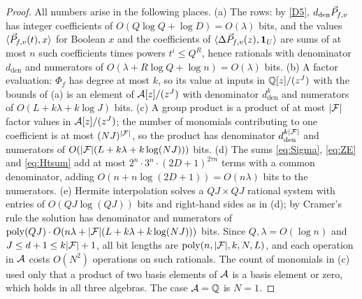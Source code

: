 \begin{proof}
All numbers arise in the following places. (a) The rows: by \ref{D5},
$d_{\mathrm{den}}\vec{P}_{f,v}$ has integer coefficients of $O(Q\log Q+\log D)=O(\lambda)$
bits, and the values $\langle \vec{P}_{f,v}(t),x\rangle$ for Boolean $x$ and the coefficients of
$\langle \Delta\vec{P}_{f,v}(z),\mathbf 1_U\rangle$ are sums of at most $n$ such coefficients
times powers $t^{i}\le Q^{R}$, hence rationals with denominator
$d_{\mathrm{den}}$ and numerators of $O(\lambda+R\log Q+\log n)=O(\lambda)$ bits.
(b) A factor evaluation: $\Phi_f$ has degree at most $k$, so its value at inputs
in $\mathbb{Q}[z]/(z^J)$ with the bounds of (a) is an element of $\mathcal{A}[z]/(z^J)$ with
denominator $d_{\mathrm{den}}^{k}$ and numerators of $O(L+k\lambda+k\log J)$ bits.
(c) A group product is a product of at most $|\mathcal{F}|$ factor values in
$\mathcal{A}[z]/(z^J)$; the number of monomials contributing to one coefficient is at
most $(NJ)^{|\mathcal{F}|}$, so the product has denominator $d_{\mathrm{den}}^{k|\mathcal{F}|}$ and
numerators of $O(|\mathcal{F}|(L+k\lambda+k\log(NJ)))$ bits. (d) The sums
\eqref{eq:Sigma}, \eqref{eq:ZE} and \eqref{eq:Htsum} add at most
$2^{n}\cdot 3^{n}\cdot(2D+1)^{2\tau n}$ terms with a common denominator, adding
$O(n+n\log(2D+1))=O(n\lambda)$ bits to the numerators. (e) Hermite interpolation
solves a $QJ\times QJ$ rational system with entries of $O(QJ\log(QJ))$ bits and
right-hand sides as in (d); by Cramer's rule the solution has denominator and
numerators of $\operatorname{poly}(QJ)\cdot O(n\lambda+|\mathcal{F}|(L+k\lambda+k\log(NJ)))$ bits. Since
$Q,\lambda=O(\log n)$ and $J\le d+1\le k|\mathcal{F}|+1$, all bit lengths are
$\operatorname{poly}(n,|\mathcal{F}|,k,N,L)$, and each
operation in $\mathcal{A}$ costs $O(N^2)$ operations on such rationals. The count of
monomials in (c) used only that a product of two basis elements of $\mathcal{A}$ is a
basis element or zero, which holds in all three algebras.
The case $\mathcal{A}=\mathbb{Q}$ is $N=1$.
\end{proof}
